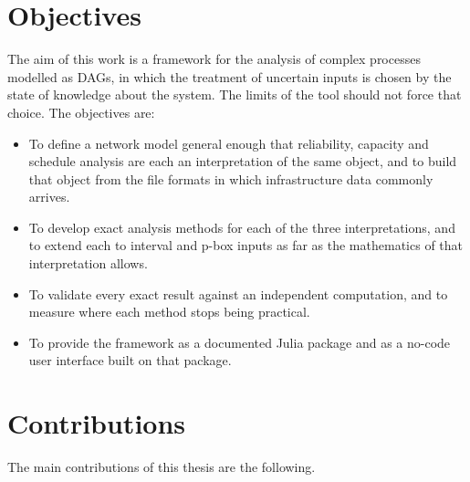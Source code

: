 \documentclass[12pt]{report}
\begin{document}
\section{Objectives}
\label{sec:intro-objectives}

The aim of this work is a framework for the analysis of complex processes modelled as DAGs, in
which the treatment of uncertain inputs is chosen by the state of knowledge about the system.
The limits of the tool should not force that choice. The objectives are:

\begin{itemize}
  \item To define a network model general enough that reliability, capacity and schedule
    analysis are each an interpretation of the same object, and to build that object from the file
    formats in which infrastructure data commonly arrives.
  \item To develop exact analysis methods for each of the three interpretations, and to extend each to
    interval and p-box inputs as far as the mathematics of that interpretation allows.
  \item To validate every exact result against an independent computation, and to measure
    where each method stops being practical.
  \item To provide the framework as a documented Julia package and as a no-code user interface
    built on that package.
\end{itemize}

\section{Contributions}
\label{sec:intro-contributions}

The main contributions of this thesis are the following.
\end{document}
